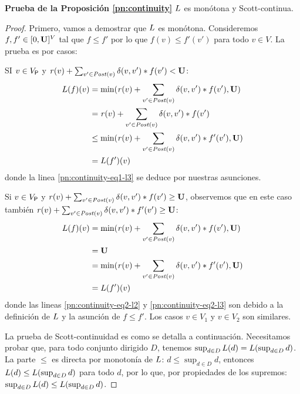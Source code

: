 \noindent
\textbf{Prueba de la Proposición \ref{pn:continuity}} $L$ es monótona y Scott-continua.
\noindent \\ 

\begin{proof}
    
    Primero, vamos a demostrar que $L$ es monótona. Consideremos $f,f' \in [0,\mathbf{U}]^V$  tal que
$f \leq f'$ por lo que $f(v) \leq f'(v')$ para todo $v \in V$.  La prueba es por casos:

    SI $v \in V_{\mathsf{P}}$ y $\mathit{r}(v) + \sum_{v' \in \mathit{Post}(v)} \delta(v,v')* f(v') < \mathbf{U}$:
\begin{align}
    L(f)(v) & = \min (\mathit{r}(v) + \sum_{v' \in \mathit{Post}(v)} \delta(v,v')* f(v'), \mathbf{U})\label{pn:continuity-eq1-l1} \\
            & = \mathit{r}(v) + \sum_{v' \in \mathit{Post}(v)} \delta(v,v')* f(v') \label{pn:continuity-eq1-l2} \\
           & \leq \min (\mathit{r}(v) + \sum_{v' \in \mathit{Post}(v)} \delta(v,v') * f'(v'), \mathbf{U})          \label{pn:continuity-eq1-l3} \\
           & = L(f')(v)  
\end{align}
    donde la linea \ref{pn:continuity-eq1-l3} se deduce por nuestras asunciones.
   
    Si $v \in V_{\mathsf{P}}$ y $\mathit{r}(v) + \sum_{v' \in \mathit{Post}(v)} \delta(v,v')* f(v') \geq \mathbf{U}$, observemos que en este caso también $\mathit{r}(v) + \sum_{v' \in \mathit{Post}(v)} \delta(v,v')* f'(v') \geq \mathbf{U}$:
\begin{align}
    L(f)(v) & = \min(\mathit{r}(v) + \sum_{v' \in \mathit{Post}(v)} \delta(v,v')* f(v'), \mathbf{U}) \label{pn:continuity-eq2-l1} \\
                            & = \mathbf{U}                                                                  \label{pn:continuity-eq2-l2} \\
                            & = \min( \mathit{r}(v) + \sum_{v' \in \mathit{Post}(v)} \delta(v,v') * f'(v'), \mathbf{U}) \label{pn:continuity-eq2-l3} \\
                            & = L(f')(v)   \label{pn:continuity-eq2-l4}
\end{align}
donde las lineas \ref{pn:continuity-eq2-l2} y  \ref{pn:continuity-eq2-l3} son debido a la definición de $L$ y la asunción de $f \leq f'$.
    Los casos $v \in V_1$ y $v \in V_2$ son similares.
    
    La prueba de Scott-continuidad es como se detalla a continuación. Necesitamos probar que, para todo conjunto dirigido $D$, tenemos $\sup_{d \in D} L(d) =  L(\sup_{d \in D} d)$.
    La parte $\leq$ es directa por monotonía de $L$: $d \leq \sup_{d \in D} d$, entonces $L(d) \leq L( \sup_{d \in D} d)$ para todo $d$,
    por lo que, por propiedades de los supremos: $\sup_{d \in D} L(d) \leq  L(\sup_{d \in D} d)$.
    

\end{proof}
